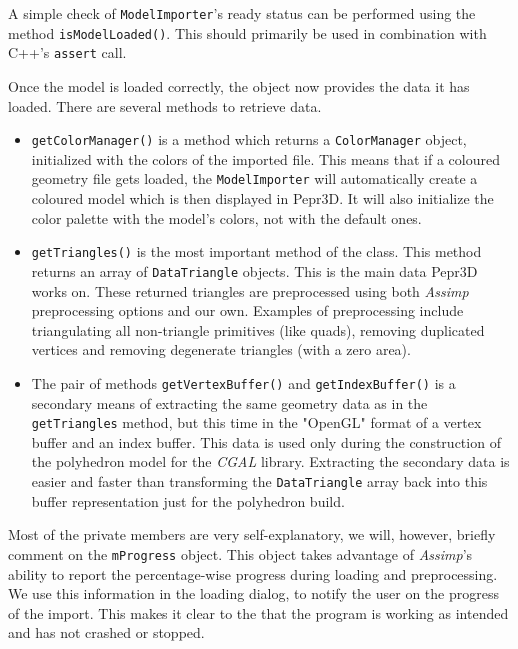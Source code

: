 A simple check of \texttt{ModelImporter}'s ready status can be performed using the method \texttt{isModelLoaded()}. This should primarily be used in combination with C++'s \texttt{assert} call.

Once the model is loaded correctly, the object now provides the data it has loaded. There are several methods to retrieve data.

\begin{itemize}
\item \texttt{getColorManager()} is a method which returns a \texttt{ColorManager} object, initialized with the colors of the imported file. This means that if a coloured geometry file gets loaded, the \texttt{ModelImporter} will automatically create a coloured model which is then displayed in Pepr3D. It will also initialize the color palette with the model's colors, not with the default ones.

\item \texttt{getTriangles()} is the most important method of the class. This method returns an array of \texttt{DataTriangle} objects. This is the main data Pepr3D works on. These returned triangles are preprocessed using both \textit{Assimp} preprocessing options and our own. Examples of preprocessing include triangulating all non-triangle primitives (like quads), removing duplicated vertices and removing degenerate triangles (with a zero area).

\item The pair of methods \texttt{getVertexBuffer()} and \texttt{getIndexBuffer()} is a secondary means of extracting the same geometry data as in the \texttt{getTriangles} method, but this time in the "OpenGL" format of a vertex buffer and an index buffer. This data is used only during the construction of the polyhedron model for the \textit{CGAL} library. Extracting the secondary data is easier and faster than transforming the \texttt{DataTriangle} array back into this buffer representation just for the polyhedron build.

\end{itemize}

Most of the private members are very self-explanatory, we will, however, briefly comment on the \texttt{mProgress} object. This object takes advantage of \textit{Assimp}'s ability to report the percentage-wise progress during loading and preprocessing. We use this information in the loading dialog, to notify the user on the progress of the import. This makes it clear to the that the program is working as intended and has not crashed or stopped.

